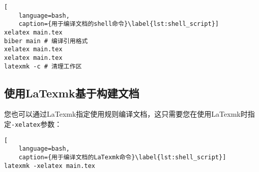 \begin{lstlisting}[
    language=bash,
    caption={用于编译文档的shell命令}\label{lst:shell_script}]
xelatex main.tex
biber main # 编译引用格式
xelatex main.tex
xelatex main.tex
latexmk -c # 清理工作区
\end{lstlisting}

\subsection{使用LaTexmk基于\XeLaTeX 构建文档}

您也可以通过LaTexmk指定使用\XeLaTeX 规则编译文档，这只需要您在使用LaTexmk时指定\texttt{-xelatex}参数：

\begin{lstlisting}[
    language=bash,
    caption={用于编译文档的LaTexmk命令}\label{lst:shell_script}]
latexmk -xelatex main.tex
\end{lstlisting}